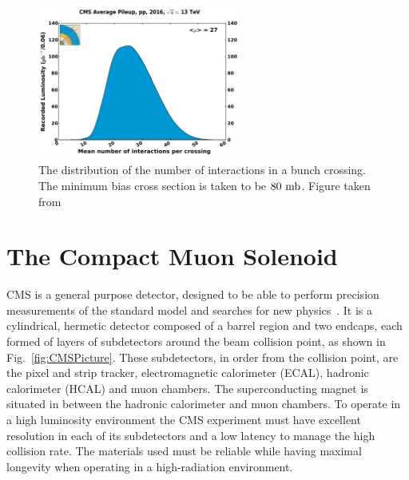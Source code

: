 \begin{figure}[htpb]
	\centering
	\includegraphics[width=0.6\textwidth]{Figures/CMSAvePU}
	\caption[The distribution of the number of interactions in a bunch crossing. The minimum bias cross section is taken to be $80\mb$.]{The distribution of the number of interactions in a bunch crossing. The minimum bias cross section is taken to be $80\mb$. Figure taken from~\cite{CMS:CMSLumi} }
	\label{fig:CMSPU}
\end{figure}


\section{The Compact Muon Solenoid}
\label{sec:CMS}

CMS is a general purpose detector, designed to be able to perform precision measurements of the standard model and searches for new physics~\cite{CMSExperiment}. 
It is a cylindrical, hermetic detector composed of a barrel region and two endcaps, each formed of layers of subdetectors around the beam collision point, as shown in Fig.~\ref{fig:CMSPicture}. 
These subdetectors, in order from the collision point, are the pixel and strip tracker, electromagnetic calorimeter (ECAL), hadronic calorimeter (HCAL) and muon chambers.
The superconducting magnet is situated in between the hadronic calorimeter and muon chambers.
To operate in a high luminosity environment the CMS experiment must have excellent resolution in each of its subdetectors and a low latency to manage the high collision rate. 
The materials used must be reliable while having maximal longevity when operating in a high-radiation environment.

